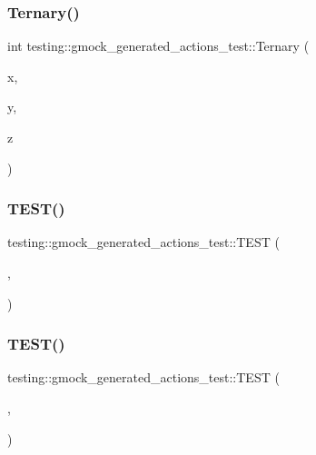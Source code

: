 \subsubsection{\texorpdfstring{Ternary()}{Ternary()}}
{\footnotesize\ttfamily int testing\+::gmock\+\_\+generated\+\_\+actions\+\_\+test\+::\+Ternary (\begin{DoxyParamCaption}\item[{int}]{x,  }\item[{char}]{y,  }\item[{short}]{z }\end{DoxyParamCaption})}

\mbox{\label{namespacetesting_1_1gmock__generated__actions__test_aee4ab8d88ec59a7e3b91d919a6ed34da}} 
\subsubsection{\texorpdfstring{TEST()}{TEST()}\hspace{0.1cm}{\footnotesize\ttfamily [1/77]}}
{\footnotesize\ttfamily testing\+::gmock\+\_\+generated\+\_\+actions\+\_\+test\+::\+T\+E\+ST (\begin{DoxyParamCaption}\item[{Invoke\+Argument\+Test}]{,  }\item[{Function0}]{ }\end{DoxyParamCaption})}

\mbox{\label{namespacetesting_1_1gmock__generated__actions__test_a47d12c8e504971d1f1c17df8d90bff82}} 
\subsubsection{\texorpdfstring{TEST()}{TEST()}\hspace{0.1cm}{\footnotesize\ttfamily [2/77]}}
{\footnotesize\ttfamily testing\+::gmock\+\_\+generated\+\_\+actions\+\_\+test\+::\+T\+E\+ST (\begin{DoxyParamCaption}\item[{Invoke\+Argument\+Test}]{,  }\item[{Functor1}]{ }\end{DoxyParamCaption})}

